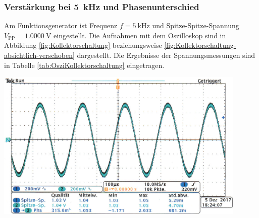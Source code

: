 \subsubsection*{Verstärkung bei \SI{5}{\kilo\hertz} und Phasenunterschied}
%
Am Funktionsgenerator ist Frequenz $f = \SI{5}{\kilo\hertz}$ und Spitze-Spitze-Spannung $V_{\text{PP}} = \SI{1,0000}{\volt}$ eingestellt.
Die Aufnahmen mit dem Oszilloskop sind in Abbildung \ref{fig:Kollektorschaltung} beziehungsweise \ref{fig:Kollektorschaltung-absichtlich-verschoben} dargestellt.
Die Ergebnisse der Spannungsmessungen sind in Tabelle \ref{tab:OsziKollektorschaltung} eingetragen.
%
\par
%
\minipage{\linewidth}
    \begin{center}
        \captionsetup{type=figure}
        \begin{adjustbox}{max width=\linewidth, keepaspectratio}
            \includegraphics[width=120mm]{jpg/Kollektorschaltung}
        \end{adjustbox}
        \label{fig:Kollektorschaltung}
    \end{center}
\endminipage
%
\par
%
\minipage{\linewidth}
